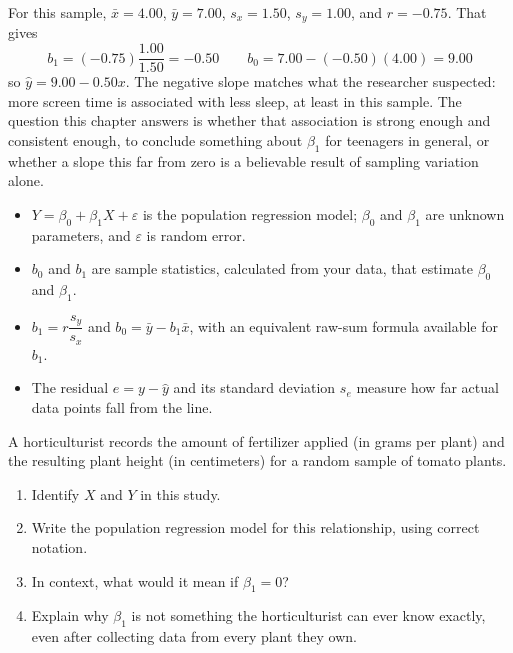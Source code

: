 For this sample, $\bar{x} = 4.00$, $\bar{y} = 7.00$, $s_x = 1.50$, $s_y = 1.00$, and $r = -0.75$. That gives
\[
b_1 = (-0.75)\frac{1.00}{1.50} = -0.50 \qquad b_0 = 7.00 - (-0.50)(4.00) = 9.00
\]
so $\hat{y} = 9.00 - 0.50x$. The negative slope matches what the researcher suspected: more screen time is associated with less sleep, at least in this sample. The question this chapter answers is whether that association is strong enough and consistent enough, to conclude something about $\beta_1$ for teenagers in general, or whether a slope this far from zero is a believable result of sampling variation alone.

\begin{itemize}
    \item $Y = \beta_0 + \beta_1 X + \varepsilon$ is the population regression model; $\beta_0$ and $\beta_1$ are unknown parameters, and $\varepsilon$ is random error.
    \item $b_0$ and $b_1$ are sample statistics, calculated from your data, that estimate $\beta_0$ and $\beta_1$.
    \item $b_1 = r\dfrac{s_y}{s_x}$ and $b_0 = \bar{y} - b_1\bar{x}$, with an equivalent raw-sum formula available for $b_1$.
    \item The residual $e = y - \hat{y}$ and its standard deviation $s_e$ measure how far actual data points fall from the line.
\end{itemize}

\begin{Exercise}[title={Identifying the Model}, label={ex:slope-model-1}]
A horticulturist records the amount of fertilizer applied (in grams per plant) and the resulting plant height (in centimeters) for a random sample of tomato plants.
\begin{enumerate}
    \item Identify $X$ and $Y$ in this study.
    \item Write the population regression model for this relationship, using correct notation.
    \item In context, what would it mean if $\beta_1 = 0$?
    \item Explain why $\beta_1$ is not something the horticulturist can ever know exactly, even after collecting data from every plant they own.
\end{enumerate}
\end{Exercise}

